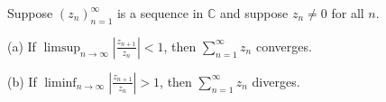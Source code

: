 Suppose $(z_n)_{n=1}^{\infty}$ is a sequence in $\mathbb{C}$ and suppose $z_n \neq 0$ for all $n$.

(a) If $\displaystyle \limsup_{n \to \infty} \left| \frac{z_{n+1}}{z_n} \right| < 1$, then $\sum_{n=1}^{\infty} z_n$ converges.

(b) If $\displaystyle \liminf_{n \to \infty} \left| \frac{z_{n+1}}{z_n} \right| > 1$, then $\sum_{n=1}^{\infty} z_n$ diverges.
